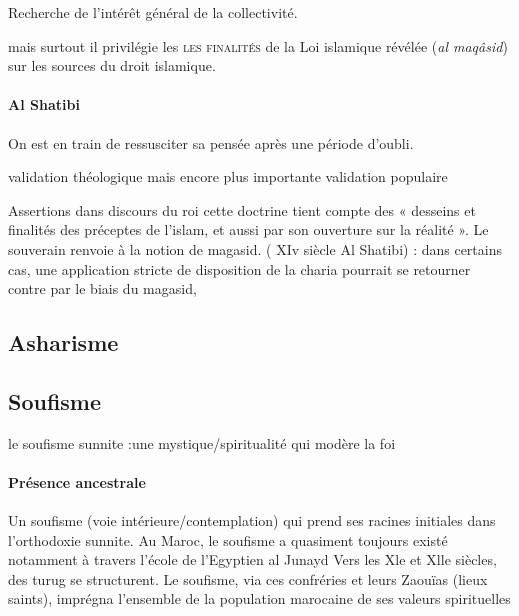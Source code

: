 \begin{Def}
    Recherche de l'intérêt général de la collectivité.
\end{Def}

mais surtout il privilégie les \textsc{les finalités} de la Loi islamique révélée (\textit{al maqâsid}) sur les sources du droit islamique.


\paragraph{Al Shatibi} On est en train de ressusciter sa pensée après une période d'oubli.

\begin{Ex}
    validation théologique mais encore plus importante validation populaire
\end{Ex}

  Assertions dans discours du roi cette doctrine tient compte des « desseins et finalités des préceptes de l'islam, et aussi par son ouverture sur la réalité ».
  Le souverain renvoie à la notion de magasid. ( XIv siècle
Al Shatibi) : dans certains cas, une application stricte de disposition de la charia pourrait se retourner contre par le biais du magasid,

\subsection{Asharisme}

\subsection{Soufisme}

\begin{Synthesis}
    le soufisme sunnite :une mystique/spiritualité qui modère la foi
\end{Synthesis}

\paragraph{Présence ancestrale}
 Un soufisme (voie intérieure/contemplation) qui prend ses racines initiales dans l'orthodoxie sunnite.
  Au Maroc, le soufisme a quasiment toujours existé notamment à travers l'école de l'Egyptien al Junayd   Vers les Xle et Xlle siècles, des turug se structurent.
 Le soufisme, via ces confréries et leurs Zaouïas (lieux saints), imprégna l'ensemble de la population marocaine de ses valeurs spirituelles 
 
